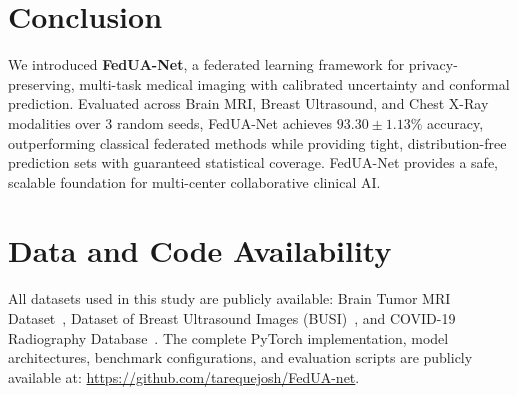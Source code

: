 \documentclass[journal]{IEEEtran}
\begin{document}
\section{Conclusion}
We introduced \textbf{FedUA-Net}, a federated learning framework for privacy-preserving, multi-task medical imaging with calibrated uncertainty and conformal prediction. Evaluated across Brain MRI, Breast Ultrasound, and Chest X-Ray modalities over 3 random seeds, FedUA-Net achieves $93.30 \pm 1.13\%$ accuracy, outperforming classical federated methods while providing tight, distribution-free prediction sets with guaranteed statistical coverage. FedUA-Net provides a safe, scalable foundation for multi-center collaborative clinical AI.

\section*{Data and Code Availability}
All datasets used in this study are publicly available: Brain Tumor MRI Dataset~\cite{cheng2015enhanced}, Dataset of Breast Ultrasound Images (BUSI)~\cite{al2020dataset}, and COVID-19 Radiography Database~\cite{chowdhury2020can}. The complete PyTorch implementation, model architectures, benchmark configurations, and evaluation scripts are publicly available at: \url{https://github.com/tarequejosh/FedUA-net}.
\end{document}
